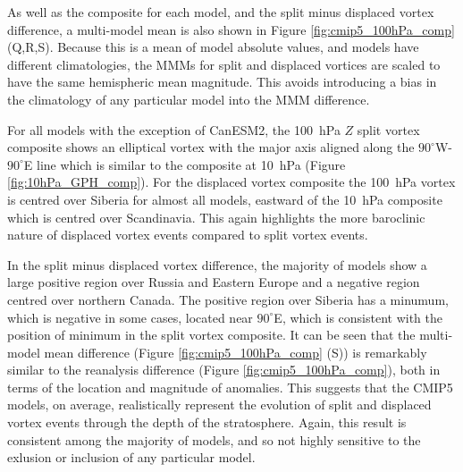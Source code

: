 As well as the composite for each model, and the split minus displaced vortex
difference, a multi-model mean is also shown in Figure
\ref{fig:cmip5_100hPa_comp} (Q,R,S). Because this is a mean of model absolute
values, and models have different climatologies, the MMMs for split and
displaced vortices are scaled to have the same hemispheric mean magnitude. This
avoids introducing a bias in the climatology of any particular model into the
MMM difference. 

For all models with the exception of CanESM2, the 100~hPa $Z$ split vortex
composite shows an elliptical vortex with the major axis aligned along the
$90^{\circ}$W-$90^{\circ}$E line which is similar to the composite at 10~hPa
(Figure \ref{fig:10hPa_GPH_comp}). For the displaced vortex composite the
100~hPa vortex is centred over Siberia for almost all models, eastward of the
10~hPa composite which is centred over Scandinavia. This again highlights the
more baroclinic nature of displaced vortex events compared to split vortex
events.

In the split minus displaced vortex difference, the majority of models show a
large positive region over Russia and Eastern Europe and a negative region
centred over northern Canada. The positive region over Siberia has a minumum,
which is negative in some cases, located near $90^{\circ}$E, which is consistent
with the position of minimum in the split vortex composite. It can be seen that
the multi-model mean difference (Figure \ref{fig:cmip5_100hPa_comp} (S)) is
remarkably similar to the reanalysis difference (Figure
\ref{fig:cmip5_100hPa_comp}), both in terms of the location and magnitude of
anomalies. This suggests that the CMIP5 models, on average, realistically
represent the evolution of split and displaced vortex events through the depth
of the stratosphere. Again, this result is consistent among the majority of
models, and so not highly sensitive to the exlusion or inclusion of any
particular model. 

